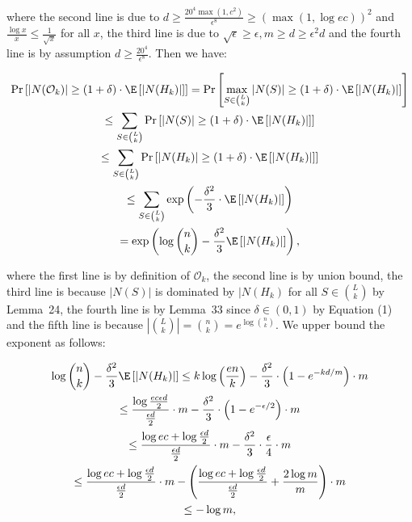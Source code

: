 \documentclass[10pt,a4paper]{article}
\begin{document}
where the second line is due to $d\geq\frac{20^{4}\max(1,c^{2})}{\epsilon^{8}}\geq(\max(1,\log{ec}))^{2}$ and $\frac{\log{x}}{x}\leq\frac{1}{\sqrt{x}}$ for all $x$, the third line is due to $\sqrt{\epsilon}\geq\epsilon,m\geq d\geq\epsilon^{2}d$ and the fourth line is by assumption $d\geq\frac{20^{4}}{\epsilon^{8}}$.
Then we have:\par


\[\begin{gathered}
\displaystyle\Pr\left[|N(\mathcal{O}_{k})|\geq(1+\delta)\cdot\E\left[|N(H_{k})|\right]\right] \displaystyle=\Pr\left[\max_{S\in\binom{L}{k}}|N(S)|\geq(1+\delta)\cdot\E\left[|N(H_{k})|\right]\right] \\
\displaystyle\leq\sum_{S\in\binom{L}{k}}\Pr\left[|N(S)|\geq(1+\delta)\cdot\E\left[|N(H_{k})|\right]\right] \\
\displaystyle\leq\sum_{S\in\binom{L}{k}}\Pr\left[|N(H_{k})|\geq(1+\delta)\cdot\E\left[|N(H_{k})|\right]\right] \\
\displaystyle\leq\sum_{S\in\binom{L}{k}}\exp\left(-\frac{\delta^{2}}{3}\cdot\E\left[|N(H_{k})|\right]\right) \\
\displaystyle=\exp\left(\log{\binom{n}{k}}-\frac{\delta^{2}}{3}\E\left[|N(H_{k})|\right]\right),
\end{gathered}\]


where the first line is by definition of $\mathcal{O}_{k}$, the second line is by union bound, the third line is because $|N(S)|$ is dominated by $|N(H_{k})$ for all $S\in\binom{L}{k}$ by Lemma 24, the fourth line is by Lemma 33 since $\delta\in(0,1)$ by Equation (1) and the fifth line is because $|\binom{L}{k}|=\binom{n}{k}=e^{\log{\binom{n}{k}}}$.
We upper bound the exponent as follows:\par


\[\begin{gathered}
\displaystyle\log{\binom{n}{k}}-\frac{\delta^{2}}{3}\E\left[|N(H_{k})|\right] \displaystyle\leq k\log\left(\frac{en}{k}\right)-\frac{\delta^{2}}{3}\cdot\left(1-e^{-kd/m}\right)\cdot m \\
\displaystyle\leq\frac{\log{\frac{ec\epsilon d}{2}}}{\frac{\epsilon d}{2}}\cdot m-\frac{\delta^{2}}{3}\cdot\left(1-e^{-\epsilon/2}\right)\cdot m \\
\displaystyle\leq\frac{\log{ec}+\log{\frac{\epsilon d}{2}}}{\frac{\epsilon d}{2}}\cdot m-\frac{\delta^{2}}{3}\cdot\frac{\epsilon}{4}\cdot m \\
\displaystyle\leq\frac{\log{ec}+\log{\frac{\epsilon d}{2}}}{\frac{\epsilon d}{2}}\cdot m-\left(\frac{\log{ec}+\log{\frac{\epsilon d}{2}}}{\frac{\epsilon d}{2}}+\frac{2\log{m}}{m}\right)\cdot m \\
\displaystyle\leq-\log{m},
\end{gathered}\]
\end{document}
